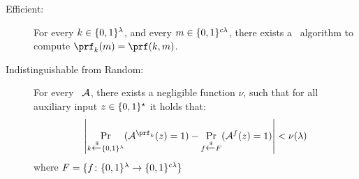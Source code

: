 {\begin{definition}
 	\begin{description}
 		
 		\item[Efficient:] For every $k \in \{0,1\}^{\lambda}$,
 		and every $m \in \{0,1\}^{c\lambda}$, there exists a \ppt\ algorithm to compute $\prf_k(m) = \prf(k, m)$.
 		
 		
 		\item[Indistinguishable from Random:] For every \ppt\ $\mathcal{A}$, there exists a negligible function $\nu$,  such that for all auxiliary input $z\in \{0,1\}^{\star}$ it holds that:
 		$$
 		\left|  \Pr_{k\from\zo{\lambda}}(\adv^{\prf_k} (z) = 1) - \Pr_{f\from F}(\adv^{f} (z) = 1) \right| < \nu(\lambda)
 		$$
 		where $F = \{f \colon \{0,1\}^{\lambda}\rightarrow \{0,1\}^{c\lambda} \}$
 	\end{description}
 \end{definition}
 }


